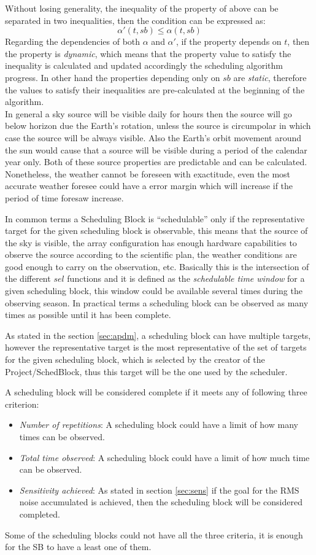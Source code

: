 \documentclass[11pt]{article}
\begin{document}
Without losing generality, the inequality of the property of above can be separated in two inequalities, then the condition can be expressed as: 
$$\alpha'(t, sb) \leq \alpha (t, sb)$$
Regarding the dependencies of both $\alpha$ and $\alpha'$, if the property depends on $t$, then the property is \textit{dynamic}, which means that the property value to satisfy the inequality is calculated and updated accordingly the scheduling algorithm progress. In other hand the properties depending only on $sb$ are \textit{static}, therefore the values to satisfy their inequalities are pre-calculated at the beginning of the algorithm.\\

In general a sky source will be visible daily for hours then the source will go below horizon due the Earth's rotation, unless the source is circumpolar in which case the source will be always visible. Also the Earth's orbit movement around the sun would cause that a source will be visible during a period of the calendar year only. Both of these source properties are predictable and can be calculated. Nonetheless, the weather cannot be foreseen with exactitude, even the most accurate weather foresee could have a error margin which will increase if the period of time foresaw increase.

In common terms a Scheduling Block is ``schedulable'' only if the representative target for the given scheduling block is observable, this means that the source of the sky is visible, the array configuration has enough hardware capabilities to observe the source according to the scientific plan, the weather conditions are good enough to carry on the observation, etc. Basically this is the intersection of the different $sel$ functions and it is defined as the \textit{schedulable time window} for a given scheduling block, this window could be available several times during the observing season. In practical terms a scheduling block can be observed as many times as possible until it has been complete.

As stated in the section \ref{sec:apdm}, a scheduling block can have multiple targets, however the representative target is the most representative of the set of targets for the given scheduling block, which is selected by the creator of the Project/SchedBlock, thus this target will be the one used by the scheduler.

A scheduling block will be considered complete if it meets any of following three criterion:
\begin{itemize}
	\item \textit{Number of repetitions}: A scheduling block could have a limit of how many times can be observed.
	\item \textit{Total time observed}: A scheduling block could have a limit of how much time can be observed.
	\item \textit{Sensitivity achieved}: As stated in section \ref{sec:sens} if the goal for the RMS noise accumulated is achieved, then the scheduling block will be considered completed.
\end{itemize} 
Some of the scheduling blocks could not have all the three criteria, it is enough for the SB to have a least one of them.
\end{document}
